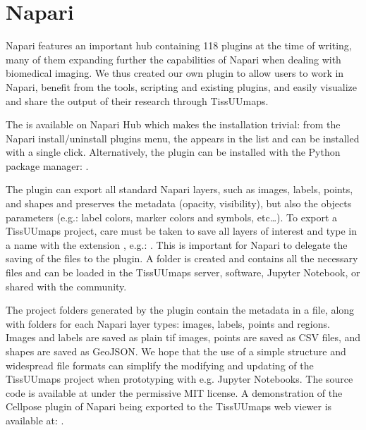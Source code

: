 \documentclass[letterpaper,10pt,english,openany,oneside]{sphinxmanual}
\begin{document}
\sphinxstepscope


\section{Napari}
\label{\detokenize{docs/advanced/napari:napari}}\label{\detokenize{docs/advanced/napari::doc}}
\sphinxAtStartPar
Napari features an important hub containing 118 plugins at the time of writing, many of them expanding further the capabilities of Napari when dealing with biomedical imaging. We thus created our own plugin to allow users to work in Napari, benefit from the tools, scripting and existing plugins, and easily visualize and share the output of their research through TissUUmaps.

\sphinxAtStartPar
The  is available on Napari Hub which makes the installation trivial: from the Napari install/uninstall plugins menu, the  appears in the list and can be installed with a single click. Alternatively, the plugin can be installed with the Python package manager: .

\sphinxAtStartPar
The plugin can export all standard Napari layers, such as images, labels, points, and shapes and preserves the metadata (opacity, visibility), but also the objects parameters (e.g.: label colors, marker colors and symbols, etc…). To export a TissUUmaps project, care must be taken to save all layers of interest and type in a name with the extension , e.g.: . This is important for Napari to delegate the saving of the files to the plugin. A folder is created and contains all the necessary files and can be loaded in the TissUUmaps server, software, Jupyter Notebook, or shared with the community.

\sphinxAtStartPar
The project folders generated by the plugin contain the metadata in a  file, along with folders for each Napari layer types: images, labels, points and regions. Images and labels are saved as plain tif images, points are saved as CSV files, and shapes are saved as GeoJSON. We hope that the use of a simple structure and widespread file formats can simplify the modifying and updating of the TissUUmaps project when prototyping with e.g. Jupyter Notebooks.
The source code is available at  under the permissive MIT license.
A demonstration of the Cellpose plugin of Napari being exported to the TissUUmaps web viewer is available at: .
\end{document}
